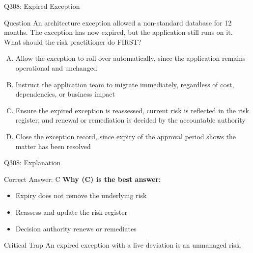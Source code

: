 \documentclass{beamer}
\begin{document}
	\begin{frame}{Q308: Expired Exception}
		\begin{block}{Question}
			\small An architecture exception allowed a non-standard database for 12 months. The exception has now expired, but the application still runs on it. What should the risk practitioner do FIRST?
		\end{block}
		\begin{enumerate}[(A)]
			\footnotesize
			\item Allow the exception to roll over automatically, since the application remains operational and unchanged
			\item Instruct the application team to migrate immediately, regardless of cost, dependencies, or business impact
			\item Ensure the expired exception is reassessed, current risk is reflected in the risk register, and renewal or remediation is decided by the accountable authority
			\item Close the exception record, since expiry of the approval period shows the matter has been resolved
		\end{enumerate}
	\end{frame}
	
	\begin{frame}{Q308: Explanation}
		\begin{block}{Correct Answer: C}
			\textbf{Why (C) is the best answer:}
			\begin{itemize}
				\item Expiry does not remove the underlying risk
				\item Reassess and update the risk register
				\item Decision authority renews or remediates
			\end{itemize}
		\end{block}
		\begin{alertblock}{Critical Trap}
			An expired exception with a live deviation is an unmanaged risk.
		\end{alertblock}
	\end{frame}
	
\end{document}
